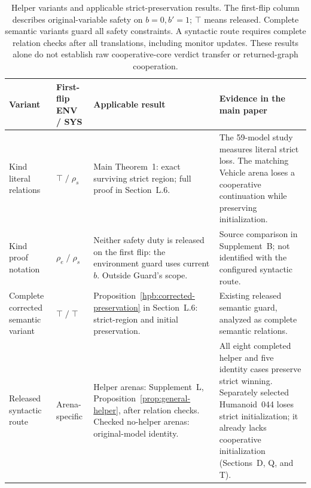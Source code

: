 \begin{table}[tbp]
\centering\small
\caption{Helper variants and applicable strict-preservation results. The first-flip column describes original-variable safety on $b=0,b'=1$; $\top$ means released. Complete semantic variants guard all safety constraints. A syntactic route requires complete relation checks after all translations, including monitor updates. These results alone do not establish raw cooperative-core verdict transfer or returned-graph cooperation.}
\label{tab:helper-variants}
\begin{tabular}{@{}L{28mm}L{23mm}L{40mm}L{53mm}@{}}
\toprule
Variant & First-flip ENV / SYS & Applicable result & Evidence in the main paper\\
\midrule
Kind~\cite[Sec.~4.1]{kind} literal relations & $\top\;/\;\rho_s$ & Main Theorem~1: exact surviving strict region; full proof in Section~L.6. & The 59-model study measures literal strict loss. The matching Vehicle arena loses a cooperative continuation while preserving initialization.\\[3pt]
Kind~\cite[App.~A]{kind} proof notation & $\rho_e\;/\;\rho_s$ & Neither safety duty is released on the first flip: the environment guard uses current $b$. Outside Guard's scope. & Source comparison in Supplement~B; not identified with the configured syntactic route.\\[3pt]
Complete corrected semantic variant & $\top\;/\;\top$ & Proposition~\ref{hpb:corrected-preservation} in Section~L.6: strict-region and initial preservation. & Existing released semantic guard, analyzed as complete semantic relations.\\[3pt]
Released syntactic route & Arena-specific & Helper arenas: Supplement~L, Proposition~\ref{prop:general-helper}, after relation checks. Checked no-helper arenas: original-model identity. & All eight completed helper and five identity cases preserve strict winning. Separately selected Humanoid~044 loses strict initialization; it already lacks cooperative initialization (Sections~D, Q, and T).\\
\bottomrule
\end{tabular}
\end{table}
